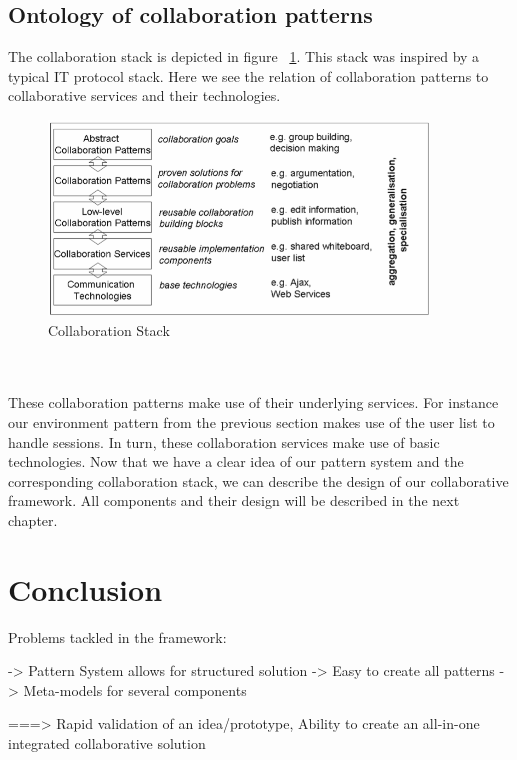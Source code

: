 \subsection{Ontology of collaboration patterns}

The collaboration stack is depicted in figure ~\ref{fig:coll_stack}. This stack was inspired by a typical IT protocol stack. Here we see the relation of collaboration patterns to collaborative services and their technologies. 
\begin{figure}[h!]
\centering
\includegraphics[width=0.9\textwidth]{images/chap5_coll_stack.png}
\caption{Collaboration Stack}
\label{fig:coll_stack}
\end{figure} \\ \\
These collaboration patterns make use of their underlying services. For instance our environment pattern from the previous section makes use of the user list to handle sessions. In turn, these collaboration services make use of basic technologies. Now that we have a clear idea of our pattern system and the corresponding collaboration stack, we can describe the design of our collaborative framework. All components and their design will be described in the next chapter.

\section{Conclusion}

Problems tackled in the framework:

-> Pattern System allows for structured solution
-> Easy to create all patterns
-> Meta-models for several components

===> Rapid validation of an idea/prototype, Ability to create an all-in-one integrated collaborative solution
